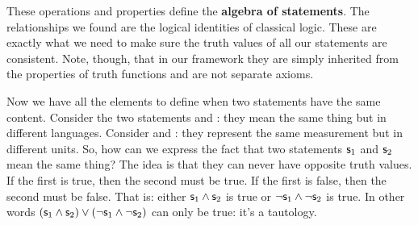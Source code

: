 \documentclass[11pt,letterpaper,fleqn]{memoir} %
\begin{document}
These operations and properties define the \textbf{algebra of statements}. The relationships we found are the logical identities of classical logic. These are exactly what we need to make sure the truth values of all our statements are consistent. Note, though, that in our framework they are simply inherited from the properties of truth functions and are not separate axioms.

Now we have all the elements to define when two statements have the same content. Consider the two statements  and : they mean the same thing but in different languages. Consider  and : they represent the same measurement but in different units. So, how can we express the fact that two statements $\mathsf{s}_1$ and $\mathsf{s}_2$ mean the same thing? The idea is that they can never have opposite truth values. If the first is true, then the second must be true. If the first is false, then the second must be false. That is: either $\mathsf{s}_1 \wedge \mathsf{s}_2$ is true or $\neg\mathsf{s}_1 \wedge \neg\mathsf{s}_2$ is true. In other words $(\mathsf{s}_1 \wedge \mathsf{s}_2) \vee (\neg\mathsf{s}_1 \wedge \neg\mathsf{s}_2)$ can only be true: it's a tautology.
\end{document}
